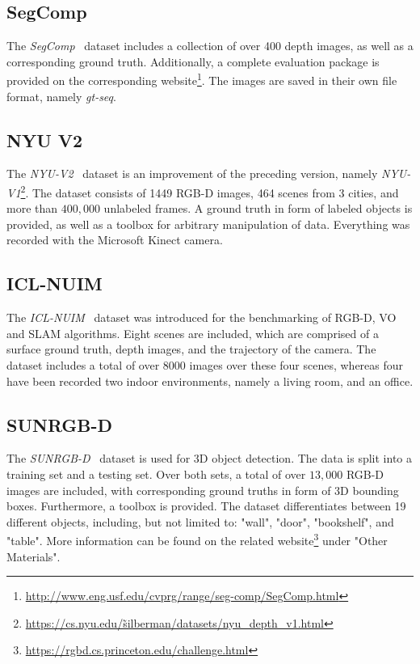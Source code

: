 \documentclass[main.tex]{subfiles}
\begin{document}
\subsection{SegComp}
\label{subsec:bg-segcomp}
The \textit{SegComp}~\cite{article} dataset
includes a collection of over 400 depth images, as well as a corresponding ground truth. Additionally, a complete
evaluation package is provided on the corresponding website\footnote{\href{http://www.eng.usf.edu/cvprg/range/seg-comp/SegComp.html}{http://www.eng.usf.edu/cvprg/range/seg-comp/SegComp.html}}.
The images are saved in their own file format, namely \textit{gt-seq}.

\subsection{NYU V2}
\label{subsec:bg-NYU}
The \textit{NYU-V2}~\cite{10.1007/978-3-642-33715-4_54} dataset is an improvement of the preceding version, namely \textit{NYU-V1}\footnote{\href{https://cs.nyu.edu/\~silberman/datasets/nyu\_depth\_v1.html}{https://cs.nyu.edu/\~silberman/datasets/nyu\_depth\_v1.html}}.
The dataset consists of 1449 RGB-D images, 464 scenes from 3 cities, and more than $400,000$ unlabeled frames.
A ground truth in form of labeled objects is provided, as well as a toolbox for arbitrary manipulation of data. Everything
was recorded with the Microsoft Kinect camera.

\subsection{ICL-NUIM}
\label{subsec:bg-ICL}
The \textit{ICL-NUIM}~\cite{Handa_Whelan_McDonald_Davison_2014} dataset was introduced for the benchmarking of RGB-D, VO and SLAM algorithms.
Eight scenes are included, which are comprised of a surface ground truth, depth images, and the trajectory of the camera.
The dataset includes a total of over 8000 images over these four scenes, whereas four have been recorded two
indoor environments, namely a living room, and an office.

\subsection{SUNRGB-D}
\label{subsec:bg-SUN}
The \textit{SUNRGB-D}~\cite{7298655} dataset is used for 3D object detection. The data is split into a training set and a testing set.
Over both sets, a total of over $13,000$ RGB-D images are included, with corresponding ground truths in form of 3D bounding boxes.
Furthermore, a toolbox is provided.
The dataset differentiates between 19 different objects, including, but not limited to: "wall", "door", "bookshelf", and "table".
More information can be found on the related website\footnote{\href{https://rgbd.cs.princeton.edu/challenge.html}{https://rgbd.cs.princeton.edu/challenge.html}}
under "Other Materials".
\end{document}
